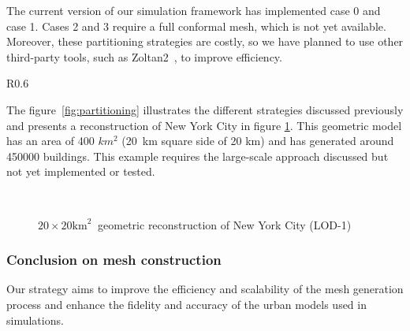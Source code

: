 \documentclass[runningheads]{llncs}
\newcommand{\imagedir}{./} %
\begin{document}
The current version of our simulation framework has implemented case 0 and case 1. Cases 2 and 3 require a full conformal mesh, which is not yet available. Moreover, these partitioning strategies are costly, so we have planned to use other third-party tools, such as Zoltan2~\cite{the_zoltan2_team_zoltan2_nodate}, to improve efficiency.
\begin{wrapfigure}{R}{0.6\textwidth}
\centering
{}
\caption{Mesh partitioning illustrations}
\label{fig:partitioning}
\end{wrapfigure}

The figure~\ref{fig:partitioning} illustrates the different strategies discussed previously and presents a reconstruction of New York City in figure \ref{fig:city-ny-largescale}. This geometric model has an area of 400 $km^2$ (20 km square side of 20 km) and has generated around 450000 buildings. This example requires the large-scale approach discussed but not yet implemented or tested. 

\begin{figure}[htbp]
\centering
{}
\hfill
{}\\
\hfill
{}
\caption{$20 \times 20 \mathrm{km}^2\ $ geometric reconstruction of New York City (LOD-1)}
\label{fig:city-ny-largescale}
\end{figure}


\subsubsection{Conclusion on mesh construction}
Our strategy aims to improve the efficiency and scalability of the mesh generation process and enhance the fidelity and accuracy of the urban models used in simulations.
\end{document}
